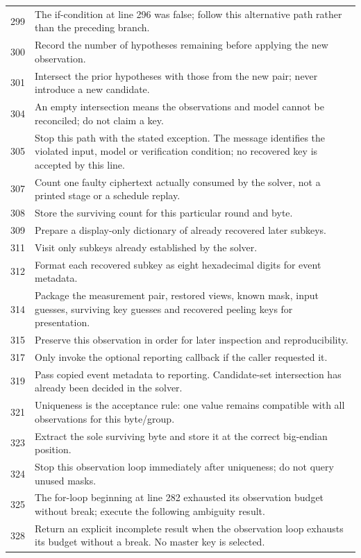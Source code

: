 \begin{longtable}{r >{\raggedright\arraybackslash}p{138mm}}
299&The if-condition at line 296 was false; follow this alternative path rather than the preceding branch.\\
300&Record the number of hypotheses remaining before applying the new observation.\\
301&Intersect the prior hypotheses with those from the new pair; never introduce a new candidate.\\
304&An empty intersection means the observations and model cannot be reconciled; do not claim a key.\\
305&Stop this path with the stated exception. The message identifies the violated input, model or verification condition; no recovered key is accepted by this line.\\
307&Count one faulty ciphertext actually consumed by the solver, not a printed stage or a schedule replay.\\
308&Store the surviving count for this particular round and byte.\\
309&Prepare a display-only dictionary of already recovered later subkeys.\\
311&Visit only subkeys already established by the solver.\\
312&Format each recovered subkey as eight hexadecimal digits for event metadata.\\
314&Package the measurement pair, restored views, known mask, input guesses, surviving key guesses and recovered peeling keys for presentation.\\
315&Preserve this observation in order for later inspection and reproducibility.\\
317&Only invoke the optional reporting callback if the caller requested it.\\
319&Pass copied event metadata to reporting. Candidate-set intersection has already been decided in the solver.\\
321&Uniqueness is the acceptance rule: one value remains compatible with all observations for this byte/group.\\
323&Extract the sole surviving byte and store it at the correct big-endian position.\\
324&Stop this observation loop immediately after uniqueness; do not query unused masks.\\
325&The for-loop beginning at line 282 exhausted its observation budget without break; execute the following ambiguity result.\\
328&Return an explicit incomplete result when the observation loop exhausts its budget without a break. No master key is selected.\\

\end{longtable}
